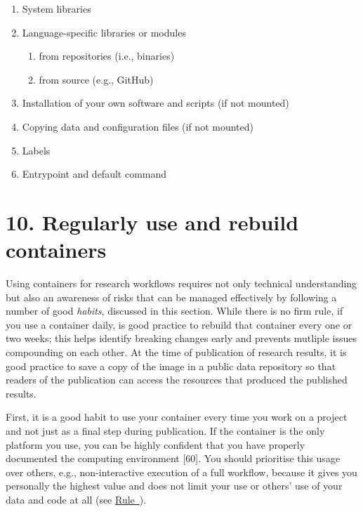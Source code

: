 \documentclass[10pt,letterpaper]{article}
\providecommand{\tightlist}{%
  \setlength{\itemsep}{0pt}\setlength{\parskip}{0pt}}
\begin{document}
\filbreak

\begin{enumerate}
\def\labelenumi{\arabic{enumi}.}
\tightlist
\item
  System libraries
\item
  Language-specific libraries or modules

  \begin{enumerate}
  \def\labelenumii{\arabic{enumii}.}
  \tightlist
  \item
    from repositories (i.e., binaries)
  \item
    from source (e.g., GitHub)
  \end{enumerate}
\item
  Installation of your own software and scripts (if not mounted)
\item
  Copying data and configuration files (if not mounted)
\item
  Labels
\item
  Entrypoint and default command
\end{enumerate}

\hypertarget{regularly-use-and-rebuild-containers}{%
\section*{10. Regularly use and rebuild
containers}\label{regularly-use-and-rebuild-containers}}

  \label{rule:usage} 

Using containers for research workflows requires not only technical
understanding but also an awareness of risks that can be managed
effectively by following a number of good \emph{habits}, discussed in
this section. While there is no firm rule, if you use a container daily,
is good practice to rebuild that container every one or two weeks; this
helps identify breaking changes early and prevents mutliple issues
compounding on each other. At the time of publication of research
results, it is good practice to save a copy of the image in a public
data repository so that readers of the publication can access the
resources that produced the published results.

First, it is a good habit to use your container every time you work on a
project and not just as a final step during publication. If the
container is the only platform you use, you can be highly confident that
you have properly documented the computing environment {[}60{]}. You
should prioritise this usage over others, e.g., non-interactive
execution of a full workflow, because it gives you personally the
highest value and does not limit your use or others' use of your data
and code at all (see
\hyperref[{rule:interactive}]{Rule~}).
\end{document}
